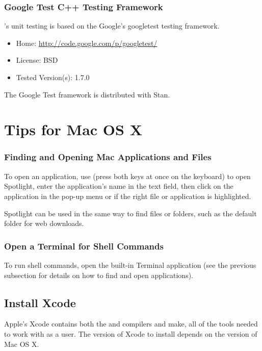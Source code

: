 \subsubsection{Google Test C++ Testing Framework}

\CmdStan's unit testing is based on the Google's googletest \Cpp testing
framework.  
%
\begin{itemize}
\item
Home: \url{http://code.google.com/p/googletest/}
\item
License: BSD
\item
Tested Version(s): 1.7.0
\end{itemize}
%
The Google Test framework is distributed with Stan.


\section{Tips for Mac OS X}

\subsubsection{Finding and Opening Mac Applications and Files}

To open an application, use  (press both keys at
once on the keyboard) to open Spotlight, enter the application's name
in the text field, then click on the application in the pop-up menu or
\code{[Return]} if the right file or application is highlighted.

Spotlight can be used in the same way to find files or folders,
such as the default  folder for web downloads.

\subsubsection{Open a Terminal for Shell Commands}

To run shell commands, open the built-in Terminal application (see the
previous subsection for details on how to find and open applications).

\subsection{Install Xcode}

Apple's Xcode contains both the \clang and \gpp compilers and make,
all of the tools needed to work with \CmdStan as a user.  The version
of Xcode to install depends on the version of Mac OS X.

